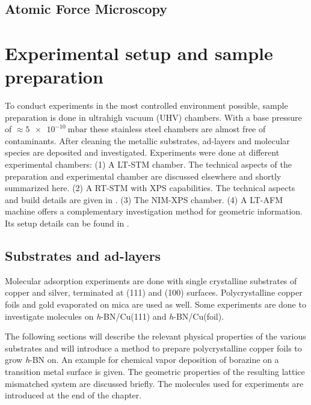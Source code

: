 \documentclass[
10pt,					%
a4paper,				%
twoside,				%
BCOR=8mm,				%
headings=normal,		%
headsepline,			%
footsepline,			%
plainfootsepline,		%
]{scrbook}
\begin{document}
  \section{\textbf{A}tomic \textbf{F}orce \textbf{M}icroscopy}
	
\chapter{Experimental setup and sample preparation}
To conduct experiments in the most controlled environment possible, sample preparation is done in ultrahigh vacuum (UHV) chambers. With a base pressure of $\approx \SI{5e-10}{\milli \bar}$ these stainless steel chambers are almost free of contaminants. After cleaning the metallic substrates, ad-layers and molecular species are deposited and investigated. Experiments were done at different experimental chambers: (1) A LT-STM chamber. The technical aspects of the preparation and experimental chamber are discussed elsewhere \cite{urgel_tendero_two-dimensional_2015, schwarz_assembly_2018, wiengarten_scanning_2015} and shortly summarized here. (2) A RT-STM with XPS capabilities. The technical aspects and build details are given in \cite{schwarz_assembly_2018}. (3) The NIM-XPS chamber. 
(4) A LT-AFM machine offers a complementary investigation method for geometric information. Its setup details can be found in \cite{he_bottom-up_2017}.


  \section{Substrates and ad-layers}
Molecular adsorption experiments are done with single crystalline substrates of copper and silver, terminated at (111) and (100) surfaces. Polycrystalline copper foils and gold evaporated on mica are used as well. Some experiments are done to investigate molecules on \textit{h}-BN/Cu(111) and \textit{h}-BN/Cu(foil). 

The following sections will describe the relevant physical properties of the various substrates and will introduce a method to prepare polycrystalline copper foils to grow \textit{h}-BN on. An example for chemical vapor deposition of borazine on a transition metal surface is given. The geometric properties of the resulting lattice mismatched system are discussed briefly. The molecules used for experiments are introduced at the end of the chapter.
\end{document}
